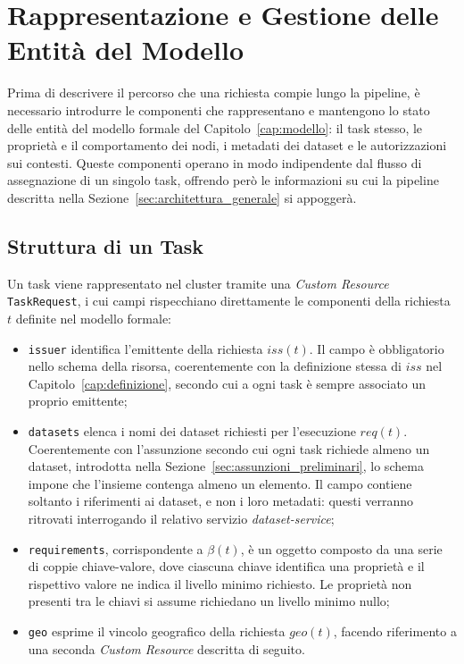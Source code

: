 \section{Rappresentazione e Gestione delle Entità del Modello}
\label{sec:entita_modello_impl}

Prima di descrivere il percorso che una richiesta compie lungo la pipeline, è necessario introdurre le componenti che rappresentano e mantengono lo stato delle entità del modello formale del Capitolo~\ref{cap:modello}: il task stesso, le proprietà e il comportamento dei nodi, i metadati dei dataset e le autorizzazioni sui contesti. Queste componenti operano in modo indipendente dal flusso di assegnazione di un singolo task, offrendo però le informazioni su cui la pipeline descritta nella Sezione~\ref{sec:architettura_generale} si appoggerà.


\subsection{Struttura di un Task}
\label{subsec:struttura_task}

Un task viene rappresentato nel cluster tramite una \emph{Custom Resource} \texttt{TaskRequest}, i cui campi rispecchiano direttamente le componenti della richiesta $t$ definite nel modello formale:

\begin{itemize} 
    \item \texttt{issuer} identifica l'emittente della richiesta $iss(t)$. Il campo è obbligatorio nello schema della risorsa, coerentemente con la definizione stessa di $iss$ nel Capitolo~\ref{cap:definizione}, secondo cui a ogni task è sempre associato un proprio emittente;
    \item \texttt{datasets} elenca i nomi dei dataset richiesti per l'esecuzione $req(t)$. Coerentemente con l'assunzione secondo cui ogni task richiede almeno un dataset, introdotta nella Sezione~\ref{sec:assunzioni_preliminari}, lo schema impone che l'insieme contenga almeno un elemento. Il campo contiene soltanto i riferimenti ai dataset, e non i loro metadati: questi verranno ritrovati interrogando il relativo servizio \emph{dataset-service};
    \item \texttt{requirements}, corrispondente a $\beta(t)$, è un oggetto composto da una serie di coppie chiave-valore, dove ciascuna chiave identifica una proprietà e il rispettivo valore ne indica il livello minimo richiesto. Le proprietà non presenti tra le chiavi si assume richiedano un livello minimo nullo;
    \item \texttt{geo} esprime il vincolo geografico della richiesta $geo(t)$, facendo riferimento a una seconda \emph{Custom Resource} descritta di seguito.
\end{itemize}

